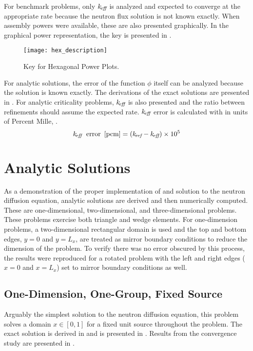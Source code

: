   For benchmark problems, only $k_{\!\mbox{\scriptsize \em eff}}$ is analyzed and expected to converge
  at the appropriate rate because the neutron flux solution is not known 
  exactly. When assembly powers were available, these are also
  presented graphically. In the graphical power representation, the key is 
  presented in .

  \begin{figure}
    \centering
    \texttt{[image: hex\_description]}
    \caption{Key for Hexagonal Power Plots.}
    \label{fig:hex_description}
  \end{figure}
  
  For analytic solutions, the error of the function $\phi$ itself can be 
  analyzed because the solution is known exactly. The derivations of the exact 
  solutions are presented in . 
  For analytic criticality  problems, $k_{\!\mbox{\scriptsize \em eff}}$ is also presented and the ratio 
  between refinements should assume the expected rate. $k_{\!\mbox{\scriptsize \em eff}}$ error is 
  calculated with  in units of Percent Mille, .
  \begin{equation}
    \label{eq:keff_err}
    k_{\!\mbox{\scriptsize \em eff}} \; \text{ error } \left[\text{{pcm}}\right] = (k_{\!\mbox{\scriptsize \em ref}} - k_{\!\mbox{\scriptsize \em eff}}) \times 10^5
  \end{equation}

\section{Analytic Solutions}
  As a demonstration of the proper implementation of and solution to the 
  neutron diffusion equation, analytic solutions are derived and then 
  numerically computed. These are one-dimensional, two-dimensional, and 
  three-dimensional problems. These problems exercise both triangle and wedge 
  elements. For one-dimension problems, a two-dimensional rectangular domain is
  used and the top and bottom edges, $y=0$ and $y=L_x$, are treated as mirror 
  boundary conditions to reduce the dimension of the problem. To verify there
  was no error obscured by this process, the results were reproduced for a 
  rotated problem with the left and right edges ($x=0$ and $x=L_x$) set to
  mirror boundary conditions as well.

  \subsection{One-Dimension, One-Group, Fixed Source}
    \label{sec:1dfixedsrc}
    Arguably the simplest solution to the neutron diffusion equation, this 
    problem  solves a domain $x \in [0,1]$ for a fixed unit source throughout
    the  problem. The exact solution is derived in 
    and is presented in . Results 
    from the convergence study are presented in .

